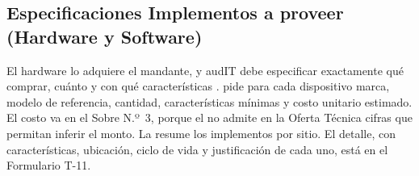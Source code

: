 \subsection{Especificaciones Implementos a proveer (Hardware y Software)}\label{sec:4-implementos}

El hardware lo adquiere el mandante, y audIT debe especificar exactamente qué comprar, cuánto y con
qué características .  pide para cada dispositivo marca,
modelo de referencia, cantidad, características mínimas y costo unitario estimado. El costo va en el
Sobre N.º~3, porque el  no admite en la Oferta Técnica cifras que permitan inferir el
monto. La  resume los implementos por sitio. El detalle, con características,
ubicación, ciclo de vida y justificación de cada uno, está en el Formulario T-11.

